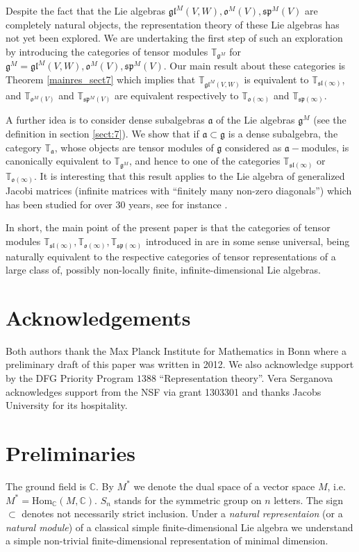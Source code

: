 \documentclass[10pt]{amsart}
\newcommand {\CC} {\mathbb {C}}
\newcommand{\TT}{\mathbb{T}}
\renewcommand{\sp}{\mathfrak{sp}}
\renewcommand{\sl}{\mathfrak{sl}}
\newcommand{\oo}{\mathfrak{o}}
\renewcommand{\aa}{\mathfrak{a}}
\renewcommand{\gg}{\mathfrak{g}}
\newcommand{\gl}{\mathfrak{gl}}
\begin{document}
Despite the fact that the Lie algebras $\gl^M(V,W), \oo^M(V),
\sp^M(V)$ are completely natural objects, the representation theory of
these Lie algebras has not yet been explored. We are undertaking the
first step of such an exploration by introducing the categories of
tensor modules $\TT_{\gg^M}$ for $\gg^M = \gl^M(V,W),
\oo^M(V),\sp^M(V)$. Our main result about these categories is 
Theorem \ref{mainres_sect7}
which implies that $\TT_{\gl^M(V,W)}$ is equivalent to
$\TT_{\sl(\infty)}$, and $\TT_{\oo^M(V)}$ and 
$\TT_{\sp^M(V)}$ are equivalent respectively to $\TT_{\oo(\infty)}$ and $\TT_{\sp(\infty)}$.

A further idea is to  consider dense subalgebras $\aa$ of the Lie algebras $\gg^M$ (see the definition in section \ref{sect:7}). We show that if $\aa \subset \gg$ is a dense subalgebra, the category $\TT_\aa$, whose objects are tensor modules of $\gg$ considered as $\aa-$modules, is canonically equivalent to $\TT_{\gg^M}$, and hence to one of the categories $\TT_{\sl(\infty)}$ or $\TT_{\oo(\infty)}$. It is interesting that this result applies to the Lie algebra of generalized Jacobi matrices (infinite matrices with ``finitely many non-zero diagonals'') which has been studied for over 30 years, see for instance \cite{FT}.

In short, the main point of the present paper is that the categories of tensor modules $\TT_{\sl(\infty)}, \TT_{\oo(\infty)}, \TT_{\sp(\infty)}$ introduced in \cite{DPS} are in some sense universal, being naturally equivalent to the respective categories of tensor representations of a large class of, possibly non-locally finite, infinite-dimensional Lie algebras.

\section*{Acknowledgements}\label{sect:acknow.}
Both authors thank the Max Planck Institute for Mathematics in Bonn where a preliminary draft of this paper was written in 2012. We also acknowledge support by the DFG Priority Program $1388$ ``Representation theory''. Vera Serganova acknowledges support from the NSF via grant 1303301 and thanks Jacobs University for its hospitality.

\section{Preliminaries}\label{sect:1}

The ground field is $\CC$. By $M^*$ we denote the dual space of a vector space $M$, i.e. $M^* = \mathrm{Hom}_{\CC}(M,\CC)$. $S_n$ stands for the symmetric group on $n$ letters. The sign $\subset$ denotes not necessarily strict inclusion. Under a \textit{natural representaion} (or a \textit{natural module}) of a classical simple finite-dimensional Lie algebra we understand a simple non-trivial finite-dimensional representation of minimal dimension.
\end{document}
